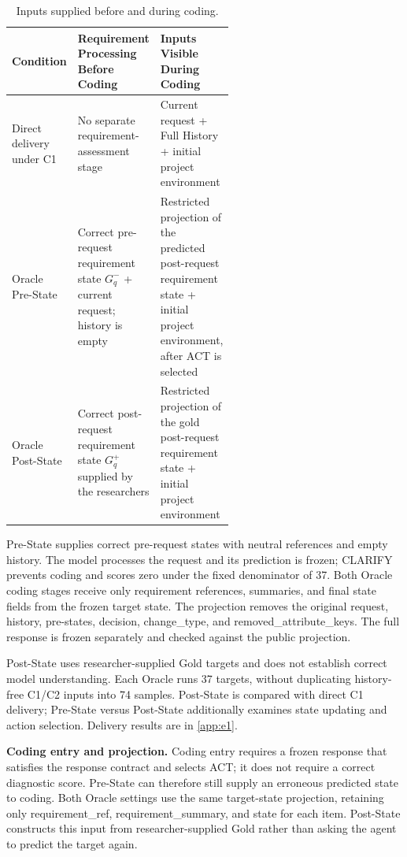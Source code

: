 \documentclass{article} %
\begin{document}
\begin{table}[htbp]
\caption{Inputs supplied before and during coding.}
\label{tab:oracle-inputs}
\centering\normalsize
\setlength{\tabcolsep}{3pt}
\renewcommand{\arraystretch}{1.08}
\begin{tabularx}{\linewidth}{@{}>{\raggedright\arraybackslash}p{0.22\linewidth}>{\raggedright\arraybackslash}p{0.34\linewidth}>{\raggedright\arraybackslash}X@{}}
\toprule
Condition & \shortstack[c]{Requirement\\Processing\\Before Coding} & \shortstack[c]{Inputs Visible\\During Coding} \\
\midrule
Direct delivery under C1 & No separate requirement-assessment stage & Current request + Full History + initial project environment \\
Oracle Pre-State & Correct pre-request requirement state $G_q^-$ + current request; history is empty & Restricted projection of the predicted post-request requirement state + initial project environment, after ACT is selected \\
Oracle Post-State & Correct post-request requirement state $G_q^+$ supplied by the researchers & Restricted projection of the gold post-request requirement state + initial project environment \\
\bottomrule
\end{tabularx}
\end{table}

Pre-State supplies correct pre-request states with neutral references and empty history. The model processes the request and its prediction is frozen; CLARIFY prevents coding and scores zero under the fixed denominator of 37. Both Oracle coding stages receive only requirement references, summaries, and final state fields from the frozen target state. The projection removes the original request, history, pre-states, decision, change\_type, and removed\_attribute\_keys. The full response is frozen separately and checked against the public projection.

Post-State uses researcher-supplied Gold targets and does not establish correct model understanding. Each Oracle runs 37 targets, without duplicating history-free C1/C2 inputs into 74 samples. Post-State is compared with direct C1 delivery; Pre-State versus Post-State additionally examines state updating and action selection. Delivery results are in \ref{app:e1}.

\textbf{Coding entry and projection.} Coding entry requires a frozen response that satisfies the response contract and selects ACT; it does not require a correct diagnostic score. Pre-State can therefore still supply an erroneous predicted state to coding. Both Oracle settings use the same target-state projection, retaining only requirement\_ref, requirement\_summary, and state for each item. Post-State constructs this input from researcher-supplied Gold rather than asking the agent to predict the target again.
\end{document}

